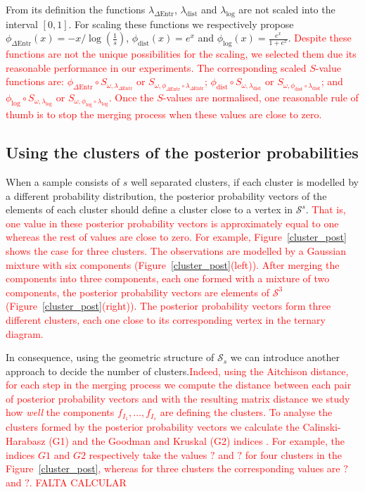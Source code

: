 \documentclass[submit]{smj}
\theoremstyle{definition}
\begin{document}
From its definition the functions $\lambda_{\Delta\text{Entr}}$, $\lambda_{\text{dist}}$ and 
$\lambda_{\log}$ are not scaled into the interval $\left[0,1\right]$. For scaling these functions we respectively propose  $\phi_{\Delta\text{Entr}}(x) = -x/{\log(\frac{1}{s})}$, $\phi_{\text{dist}}(x) = e^x$ and $\phi_{\log}(x) = \frac{e^x}{1+e^x}$. \textcolor{red}{Despite these functions are not the unique possibilities for the scaling, we selected them due its reasonable performance in our experiments. The corresponding scaled $S$-value functions are: 
  $\phi_{\Delta\text{Entr}} \circ S_{\omega, \lambda_{\Delta\text{Entr}}}$ or $S_{\omega, \phi_{\Delta\text{Entr}} \circ \lambda_{\Delta\text{Entr}}}$; $\phi_{\text{dist}} \circ S_{\omega, \lambda_{\text{dist}}}$ or $S_{\omega, \phi_{\text{dist}} \circ \lambda_{\text{dist}}}$; and $\phi_{\log} \circ S_{\omega, \lambda_{\log}}$ or $S_{\omega, \phi_{\log} \circ \lambda_{\log}}$. Once the $S$-values are normalised, one reasonable rule of thumb is to stop the merging process when these values are close to zero.}

\subsection{Using the clusters of the posterior probabilities}\label{coda_clusters}

When a sample consists of $s$ well separated clusters, if each cluster is modelled by a different probability distribution, the posterior probability vectors of the elements of each cluster should define a cluster close to a vertex in $\mathcal{S}^s$. \textcolor{red}{That is, one value in these posterior probability vectors is approximately equal to one whereas the rest of values are close to zero. For example, Figure~\ref{cluster_post} shows the case for three clusters. The observations are modelled by a Gaussian mixture with six components (Figure~\ref{cluster_post}(left)). After merging the components into three components, each one formed with a mixture of two components, the posterior probability vectors are elements of $\mathcal{S}^3$ (Figure~\ref{cluster_post}(right)). The posterior probability vectors form three different clusters, each one close to its corresponding vertex in the ternary diagram.} 

In consequence, using the geometric structure of $\mathcal{S}_s$  we can introduce another approach to decide the number of clusters.\textcolor{red}{Indeed, using the Aitchison distance, for each step in the merging process we compute the distance between each pair of posterior probability vectors and with the resulting matrix distance we study how {\it well} the components $f_{I_1}, \dots, f_{I_s}$ are defining the clusters. To analyse the clusters formed by the posterior probability vectors we calculate the Calinski-Harabasz (G1) and the Goodman and Kruskal (G2) indices \citep{milligan1985}. For example, the indices $G1$ and $G2$ respectively take the values $?$ and $?$ for four clusters in the  Figure~\ref{cluster_post}, whereas for three clusters the corresponding values are $?$ and $?$. FALTA CALCULAR}
\end{document}
